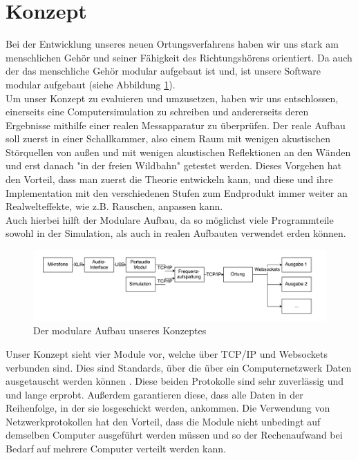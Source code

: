 \section{Konzept}
Bei der Entwicklung unseres neuen Ortungsverfahrens haben wir uns stark am menschlichen Gehör und seiner Fähigkeit des Richtungshörens orientiert. Da auch der das menschliche Gehör modular aufgebaut ist und, ist unsere Software modular aufgebaut (siehe Abbildung \ref{fig:flowchart}). \\
Um unser Konzept zu evaluieren und umzusetzen, haben wir uns entschlossen, einerseits eine Computersimulation zu schreiben und andererseits deren Ergebnisse mithilfe einer realen Messapparatur zu überprüfen. Der reale Aufbau soll zuerst in einer Schallkammer, also einem Raum mit wenigen akustischen Störquellen von außen und mit wenigen akustischen Reflektionen an den Wänden und erst danach "in der freien Wildbahn" getestet werden. Dieses Vorgehen hat den Vorteil, dass man zuerst die Theorie entwickeln kann, und diese und ihre Implementation mit den verschiedenen Stufen zum  Endprodukt immer weiter an Realwelteffekte, wie z.B. Rauschen, anpassen kann.\\
Auch hierbei hilft der Modulare Aufbau, da so möglichst viele Programmteile sowohl in der Simulation, als auch in realen Aufbauten verwendet erden können. 
\begin{figure}[H]
    \includegraphics[width=\linewidth]{img/flowchart}
	\caption{Der modulare Aufbau unseres Konzeptes}
	\label{fig:flowchart}
\end{figure}
Unser Konzept sieht vier Module vor, welche über TCP/IP und Websockets verbunden sind. Dies sind Standards, über die über ein Computernetzwerk Daten ausgetauscht werden können \cite{tcp} \cite{websockets}. Diese beiden Protokolle sind sehr zuverlässig und und lange erprobt. Außerdem garantieren diese, dass alle Daten in der Reihenfolge, in der sie losgeschickt werden, ankommen. Die Verwendung von Netzwerkprotokollen hat den Vorteil, dass die Module nicht unbedingt auf demselben Computer ausgeführt werden müssen und so der Rechenaufwand bei Bedarf auf mehrere Computer verteilt werden kann.

